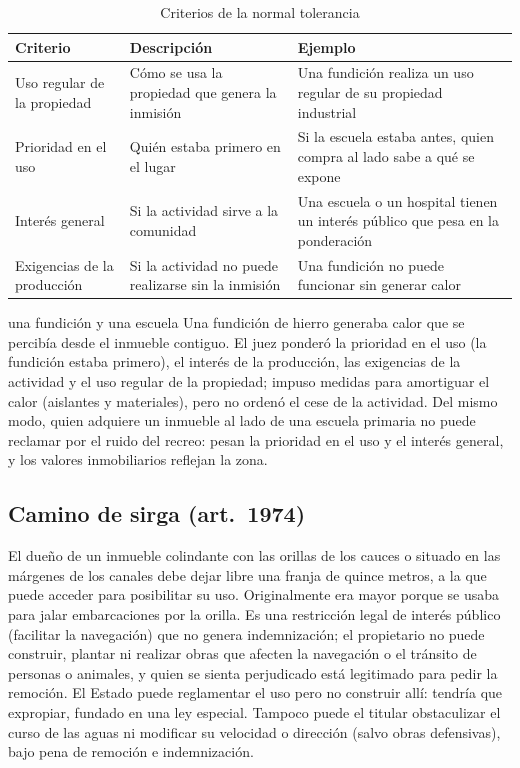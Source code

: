 \documentclass[12pt,oneside]{book}
\begin{document}
\begin{table}[H]
\centering
\small
\begin{tabularx}{\textwidth}{>{\raggedright\arraybackslash}p{}>{\raggedright\arraybackslash}X>{\raggedright\arraybackslash}X}
\toprule
\textbf{Criterio} & \textbf{Descripción} & \textbf{Ejemplo} \\
\midrule
Uso regular de la propiedad & Cómo se usa la propiedad que genera la inmisión & Una fundición realiza un uso regular de su propiedad industrial \\
Prioridad en el uso & Quién estaba primero en el lugar & Si la escuela estaba antes, quien compra al lado sabe a qué se expone \\
Interés general & Si la actividad sirve a la comunidad & Una escuela o un hospital tienen un interés público que pesa en la ponderación \\
Exigencias de la producción & Si la actividad no puede realizarse sin la inmisión & Una fundición no puede funcionar sin generar calor \\
\bottomrule
\end{tabularx}
\caption{Criterios de la normal tolerancia}
\end{table}

\begin{ejemplo}{una fundición y una escuela}
Una fundición de hierro generaba calor que se percibía desde el inmueble contiguo. El juez ponderó la prioridad en el uso (la fundición estaba primero), el interés de la producción, las exigencias de la actividad y el uso regular de la propiedad; impuso medidas para amortiguar el calor (aislantes y materiales), pero no ordenó el cese de la actividad. Del mismo modo, quien adquiere un inmueble al lado de una escuela primaria no puede reclamar por el ruido del recreo: pesan la prioridad en el uso y el interés general, y los valores inmobiliarios reflejan la zona.
\end{ejemplo}

\subsection{Camino de sirga (art.~1974)}

El dueño de un inmueble colindante con las orillas de los cauces o situado en las márgenes de los canales debe dejar libre una franja de quince metros, a la que puede acceder para posibilitar su uso. Originalmente era mayor porque se usaba para jalar embarcaciones por la orilla. Es una restricción legal de interés público (facilitar la navegación) que no genera indemnización; el propietario no puede construir, plantar ni realizar obras que afecten la navegación o el tránsito de personas o animales, y quien se sienta perjudicado está legitimado para pedir la remoción. El Estado puede reglamentar el uso pero no construir allí: tendría que expropiar, fundado en una ley especial. Tampoco puede el titular obstaculizar el curso de las aguas ni modificar su velocidad o dirección (salvo obras defensivas), bajo pena de remoción e indemnización.
\end{document}

